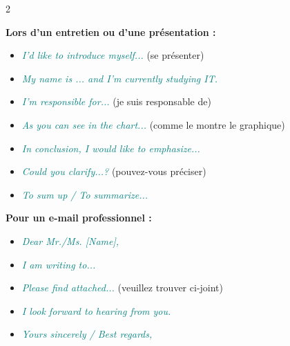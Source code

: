 \documentclass[a4paper,10pt]{article}
\newcommand{\en}[1]{\textit{\textcolor{teal}{#1}}}
\begin{document}
\begin{multicols}{2}
\begin{tcolorbox}[basebox, colframe=teal, title=5. ANGLAIS — Expressions professionnelles]
\textbf{Lors d'un entretien ou d'une présentation :}
\begin{itemize}
  \item \en{I'd like to introduce myself...} (se présenter)
  \item \en{My name is ... and I'm currently studying IT.}
  \item \en{I'm responsible for...} (je suis responsable de)
  \item \en{As you can see in the chart...} (comme le montre le graphique)
  \item \en{In conclusion, I would like to emphasize...}
  \item \en{Could you clarify...?} (pouvez-vous préciser)
  \item \en{To sum up / To summarize...}
\end{itemize}
\vspace{4pt}
\textbf{Pour un e-mail professionnel :}
\begin{itemize}
  \item \en{Dear Mr./Ms. [Name],}
  \item \en{I am writing to...}
  \item \en{Please find attached...} (veuillez trouver ci-joint)
  \item \en{I look forward to hearing from you.}
  \item \en{Yours sincerely / Best regards,}
\end{itemize}
\end{tcolorbox}


\end{multicols}
\end{document}
